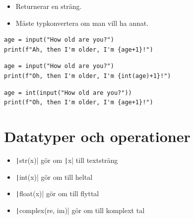 \begin{frame}
  \begin{remark}
    \begin{itemize}
      \item Returnerar en sträng.
      \item Måste typkonvertera om man vill ha annat.
    \end{itemize}
  \end{remark}
\end{frame}

\begin{frame}[fragile]
  \begin{example}
    \begin{verbatim}
age = input("How old are you?")
print(f"Ah, then I'm older, I'm {age+1}!")
    \end{verbatim}
  \end{example}

  \pause

  \begin{example}[Funkar]
    \begin{verbatim}
age = input("How old are you?")
print(f"Oh, then I'm older, I'm {int(age)+1}!")
    \end{verbatim}
  \end{example}

  \begin{example}[Funkar]
    \begin{verbatim}
age = int(input("How old are you?"))
print(f"Oh, then I'm older, I'm {age+1}!")
    \end{verbatim}
  \end{example}
\end{frame}

\section{Datatyper och operationer}

\begin{frame}
  \begin{remark}
    \begin{itemize}
      \item \texttt|str(x)| gör om \texttt|x| till textsträng
      \item \texttt|int(x)| gör om till heltal
      \item \texttt|float(x)| gör om till flyttal
      \item \texttt|complex(re, im)| gör om till komplext tal
    \end{itemize}
  \end{remark}
\end{frame}


